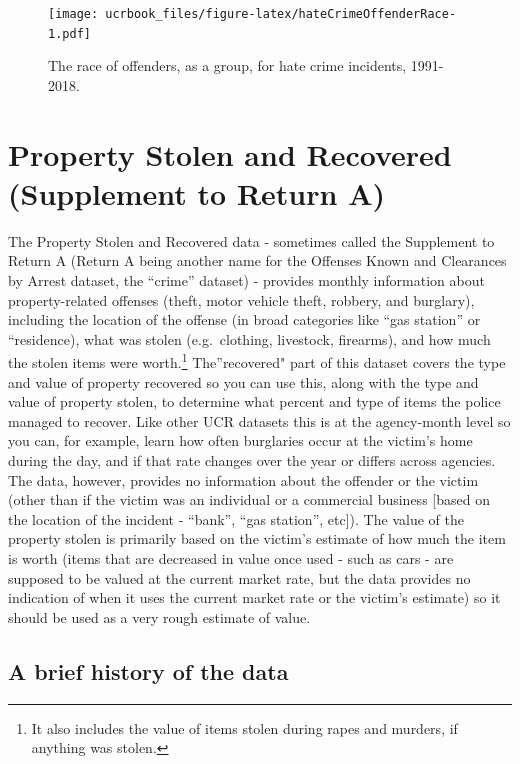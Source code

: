 \documentclass[
  12pt,
  openany]{book}
\begin{document}
\begin{figure}
\centering
\texttt{[image: ucrbook\_files/figure-latex/hateCrimeOffenderRace-1.pdf]}
\caption{\label{fig:hateCrimeOffenderRace}The race of offenders, as a group, for hate crime incidents, 1991-2018.}
\end{figure}

\hypertarget{stolen_property}{%
\chapter{Property Stolen and Recovered (Supplement to Return A)}\label{stolen_property}}

The Property Stolen and Recovered data - sometimes called the Supplement to Return A (Return A being another name for the Offenses Known and Clearances by Arrest dataset, the ``crime'' dataset) - provides monthly information about property-related offenses (theft, motor vehicle theft, robbery, and burglary), including the location of the offense (in broad categories like ``gas station'' or ``residence), what was stolen (e.g.~clothing, livestock, firearms), and how much the stolen items were worth.\footnote{It also includes the value of items stolen during rapes and murders, if anything was stolen.} The''recovered" part of this dataset covers the type and value of property recovered so you can use this, along with the type and value of property stolen, to determine what percent and type of items the police managed to recover. Like other UCR datasets this is at the agency-month level so you can, for example, learn how often burglaries occur at the victim's home during the day, and if that rate changes over the year or differs across agencies. The data, however, provides no information about the offender or the victim (other than if the victim was an individual or a commercial business {[}based on the location of the incident - ``bank'', ``gas station'', etc{]}). The value of the property stolen is primarily based on the victim's estimate of how much the item is worth (items that are decreased in value once used - such as cars - are supposed to be valued at the current market rate, but the data provides no indication of when it uses the current market rate or the victim's estimate) so it should be used as a very rough estimate of value.

\hypertarget{a-brief-history-of-the-data-3}{%
\section{A brief history of the data}\label{a-brief-history-of-the-data-3}}
\end{document}
